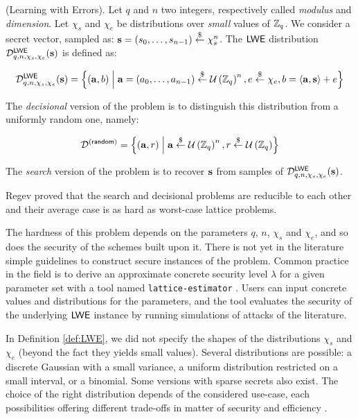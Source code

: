 \begin{definition}
	(Learning with Errors). Let $q$ and $n$ two integers, respectively called \textit{modulus} and \textit{dimension}.  Let $\chi_s$ and $\chi_e$ be distributions over \textit{small} values of $\mathbb{Z}_q$. We consider a secret vector, sampled as: $\mathbf s = (s_0, \dots, s_{n-1}) \overset{\$}{\leftarrow} \chi_s^n$. The $\textsf{LWE}$ distribution $\mathcal{D}_{q, n, \chi_s, \chi_e}^{\textsf{LWE}}(\mathbf s)$ is defined as:
	
	 \[
	 \mathcal{D}_{q, n, \chi_s, \chi_e}^{\textsf{LWE}}(\mathbf s) = \left \{(\mathbf a, b) \;\middle|\; \mathbf a = (a_0, \dots, a_{n-1}) \overset{\$}{\leftarrow} \mathcal U \left ( \mathbb{Z}_q \right )^n, e \overset{\$}{\leftarrow} \chi_e, b = \left \langle \mathbf a, \mathbf s \right \rangle + e \right \}
	  \]
	 
	 The \textit{decisional} version of the problem is to distinguish this distribution from a uniformly random one, namely:
	
	\[
	\mathcal{D}^{(\textsf{random})} = \left \{(\mathbf a, r) \;\middle|\; \mathbf a \overset{\$}{\leftarrow} \mathcal U \left ( \mathbb{Z}_q \right )^n, r \overset{\$}{\leftarrow} \mathcal U \left ( \mathbb{Z}_q \right ) \right\}
	\]

	The \emph{search} version of the problem is to recover $\mathbf s$ from samples of $\mathcal{D}_{q, n, \chi_s, \chi_e}^{\textsf{LWE}}(\mathbf s)$. 
	\label{def:LWE}
\end{definition}


Regev proved that the search and decisional problems are reducible to each other and their average case is as hard as worst-case lattice problems.

The hardness of this problem depends on the parameters $q$, $n$, $\chi_s$ and $\chi_e$, and so does the security of the schemes built upon it. There is not yet in the literature simple guidelines to construct secure instances of the problem. Common practice in the field is to derive an approximate concrete security level $\lambda$ for a given parameter set with a tool named \texttt{lattice-estimator} \cite{lattice-estimator}. Users can input concrete values and distributions for the parameters, and the tool evaluates the security of the underlying $\textsf{LWE}$ instance by running simulations of attacks of the literature.

In Definition \ref{def:LWE}, we did not specify the shapes of the distributions $\chi_s$ and $\chi_e$ (beyond the fact they yields small values). Several distributions are possible: a discrete Gaussian with a small variance, a uniform distribution restricted on a small interval, or a binomial. Some versions with sparse secrets also exist. The choice of the right distribution depends of the considered use-case, each possibilities offering different trade-offs in matter of security and efficiency \cite{AFRICACRYPT:BGPW16, DBLP:conf/ccs/CurtisP19, EPRINT:BGPT19, EPRINT:SLZS24}.


